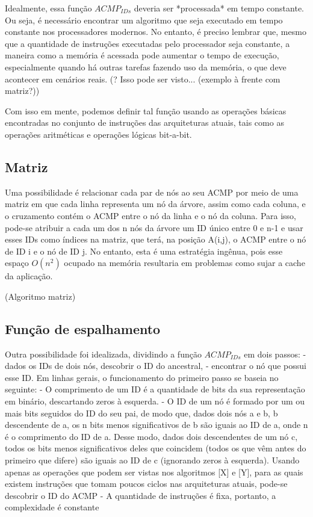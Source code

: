 \documentclass{ufsc-thesis}
\begin{document}
Idealmente, essa função $ACMP_{IDs}$ deveria ser *processada* em tempo constante.
Ou seja, é necessário encontrar um algoritmo que seja executado em tempo constante nos processadores modernos.
No entanto, é preciso lembrar que, mesmo que a quantidade de instruções executadas pelo processador seja constante,
a maneira como a memória é acessada pode aumentar o tempo de execução, especialmente quando há outras tarefas fazendo uso da memória, o que deve acontecer em cenários reais.
(? Isso pode ser visto... (exemplo à frente com matriz?))

Com isso em mente, podemos definir tal função usando as operações básicas encontradas no conjunto de instruções das arquiteturas atuais,
tais como as operações aritméticas e operações lógicas bit-a-bit.

\subsection{Matriz}

Uma possibilidade é relacionar cada par de nós ao seu ACMP por meio de uma matriz
em que cada linha representa um nó da árvore, assim como cada coluna, e o cruzamento contém o ACMP entre o nó da linha e o nó da coluna.
Para isso, pode-se atribuir a cada um dos n nós da árvore um ID único entre 0 e n-1 e usar esses IDs como índices na matriz,
que terá, na posição A(i,j), o ACMP entre o nó de ID i e o nó de ID j.
No entanto, esta é uma estratégia ingênua, pois esse espaço $O(n^2)$ ocupado na memória resultaria em problemas como sujar a cache da aplicação.

(Algoritmo matriz)

\subsection{Função de espalhamento}

Outra possibilidade foi idealizada, dividindo a função $ACMP_{IDs}$ em dois passos:
- dados os IDs de dois nós, descobrir o ID do ancestral,
- encontrar o nó que possui esse ID.
Em linhas gerais, o funcionamento do primeiro passo se baseia no seguinte:
- O comprimento de um ID é a quantidade de bits da sua representação em binário, descartando zeros à esquerda.
- O ID de um nó é formado por um ou mais bits seguidos do ID do seu pai, de modo que, dados dois nós a e b, b descendente de a,
os n bits menos significativos de b são iguais ao ID de a, onde n é o comprimento do ID de a.
Desse modo, dados dois descendentes de um nó c, todos os bits menos significativos deles que coincidem
(todos os que vêm antes do primeiro que difere) são iguais ao ID de c (ignorando zeros à esquerda).
Usando apenas as operações que podem ser vistas nos algoritmos [X] e [Y],
para as quais existem instruções que tomam poucos ciclos nas arquiteturas atuais, pode-se descobrir o ID do ACMP
- A quantidade de instruções é fixa, portanto, a complexidade é constante
\end{document}
